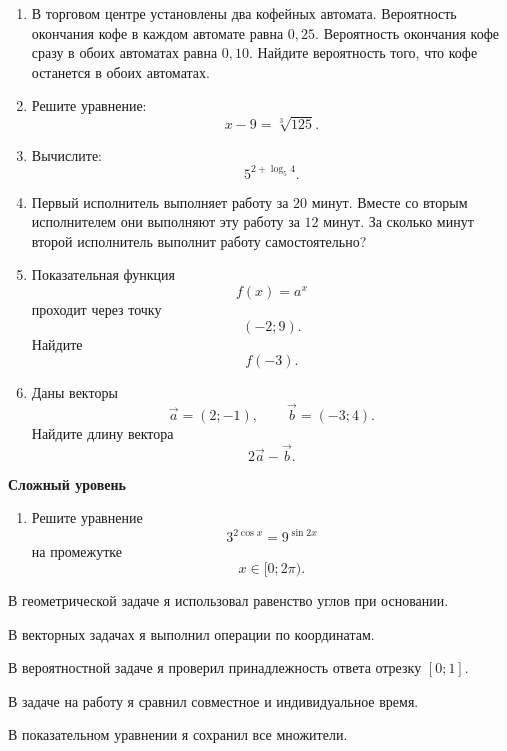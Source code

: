 \documentclass[a4paper,12pt]{article}
\newcommand{\subtopic}[1]{%
  \par\medskip
  {\large\bfseries\color{darkaccent}#1\par}
  \vspace{0.2em}
}
\begin{document}
\begin{enumerate}[resume]
  \item
  В торговом центре установлены два кофейных автомата.
  Вероятность окончания кофе в каждом автомате равна \(0,25\).
  Вероятность окончания кофе сразу в обоих автоматах равна
  \(0,10\). Найдите вероятность того, что кофе останется в обоих
  автоматах.

  \item
  Решите уравнение:
  \[
  x-9=\sqrt[3]{125}.
  \]

  \item
  Вычислите:
  \[
  5^{2+\log_5 4}.
  \]

  \item
  Первый исполнитель выполняет работу за \(20\) минут.
  Вместе со вторым исполнителем они выполняют эту работу за
  \(12\) минут. За сколько минут второй исполнитель выполнит
  работу самостоятельно?

  \item
  Показательная функция
  \[
  f(x)=a^x
  \]
  проходит через точку
  \[
  (-2;9).
  \]
  Найдите
  \[
  f(-3).
  \]

  \item
  Даны векторы
  \[
  \vec a=(2;-1),
  \qquad
  \vec b=(-3;4).
  \]
  Найдите длину вектора
  \[
  2\vec a-\vec b.
  \]
\end{enumerate}

\subtopic{Сложный уровень}

\begin{enumerate}[resume]
  \item
  Решите уравнение
  \[
  3^{2\cos x}=9^{\sin 2x}
  \]
  на промежутке
  \[
  x\in[0;2\pi).
  \]
\end{enumerate}

\vfill

\begin{checklist}
  \item В геометрической задаче я использовал равенство углов при основании.
  \item В векторных задачах я выполнил операции по координатам.
  \item В вероятностной задаче я проверил принадлежность ответа отрезку \([0;1]\).
  \item В задаче на работу я сравнил совместное и индивидуальное время.
  \item В показательном уравнении я сохранил все множители.
\end{checklist}

\clearpage
\thispagestyle{fancy}
\end{document}
